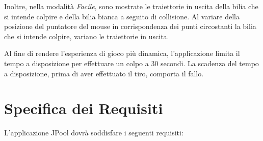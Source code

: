 \documentclass[12pt,a4paper]{report}
\begin{document}
Inoltre, nella modalità \emph{Facile}, sono mostrate le traiettorie in uscita della bilia che si intende colpire e della bilia bianca a seguito di collisione.
Al variare della posizione del puntatore del mouse in corrispondenza dei punti circostanti la bilia che si intende colpire, variano le traiettorie in uscita. 

\vspace{3mm}

Al fine di rendere l'esperienza di gioco più dinamica, l'applicazione limita il tempo a disposizione per effettuare un colpo a 30 secondi.
La scadenza del tempo a disposizione, prima di aver effettuato il tiro, comporta il fallo.

\chapter{Specifica dei Requisiti} \label{ch:Specifications} %
L'applicazione JPool dovrà soddisfare i seguenti requisiti:
\end{document}
